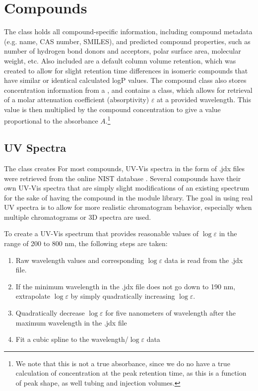 \documentclass{article}
\newcommand{\cbtt}[1]{\textcolor{codepurple}{\fontseries{b}\selectfont{\texttt{#1}}}}
\begin{document}
\section{Compounds}\label{sec:comp}
The \cbtt{Compound} class holds all compound-specific information, including compound metadata (e.g. name, CAS number, SMILES), and predicted compound properties, such as number of hydrogen bond donors and acceptors, polar surface area, molecular weight, etc. Also included are a default column volume retention, which was created to allow for slight retention time differences in isomeric compounds that have similar or identical calculated logP values. The compound class also stores concentration information from a \cbtt{Sample}, and contains a \cbtt{UVSpectrum} class, which allows for retrieval of a molar attenuation coefficient (absorptivity) $\varepsilon$ at a provided wavelength. This value is then multiplied by the compound concentration to give a value proportional to the absorbance $A$.\footnote{We note that this is not a true absorbance, since we do no have a true calculation of concentration at the peak retention time, as this is a function of peak shape, as well tubing and injection volumes.}

\subsection{UV Spectra}

The \cbtt{UVSpectrum} class creates
For most compounds, UV-Vis spectra in the form of .jdx files were retrieved from the online NIST database \cite{nistUV}. Several compounds have their own UV-Vis spectra that are simply slight modifications of an existing spectrum for the sake of having the compound in the module library. The goal in using real UV spectra is to allow for more realistic chromatogram behavior, especially when multiple chromatograms or 3D spectra are used. 

To create a UV-Vis spectrum that provides reasonable values of $\log \varepsilon$ in the range of 200 to 800 nm, the following steps are taken:
\begin{enumerate}
\item Raw wavelength values and corresponding $\log \varepsilon$ data is read from the .jdx file. 
\item If the minimum wavelength in the .jdx file does not go down to 190 nm, extrapolate $\log \varepsilon$ by simply quadratically increasing $\log \varepsilon$. 
\item Quadratically decrease $\log \varepsilon$ for five nanometers of wavelength after the maximum wavelength in the .jdx file
\item Fit a cubic spline to the wavelength/$\log \varepsilon$ data
\end{enumerate}
\end{document}
